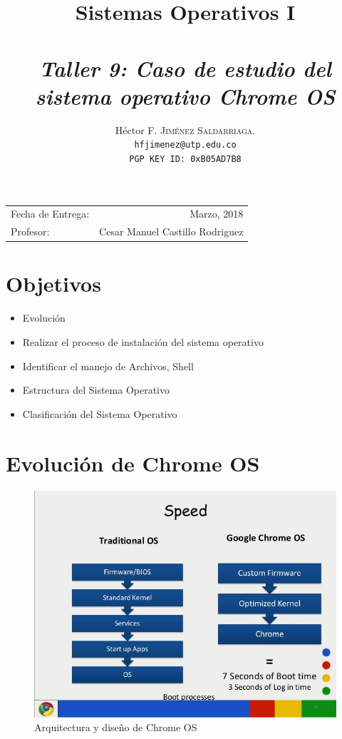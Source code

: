 \documentclass[paper=a4, fontsize=12pt]{article} 		%
\title{Sistemas Operativos I\\ 
\horrule{0.5pt} \\[0.4cm] 								%
\textit{Taller 9: Caso de estudio del sistema operativo Chrome OS}
\horrule{1pt} \\[0.5cm] 			
}
\author{												
Héctor F. \textsc{Jiménez Saldarriaga.}\\				%
\texttt{hfjimenez@utp.edu.co} \\						
\texttt{PGP KEY ID: 0xB05AD7B8}
}
\date{}    						                       %
\numberwithin{equation}{section}						%
\numberwithin{table}{section} 							%
\begin{document}
\maketitle                      			           %
\begin{center}
\begin{tabular}{l r}								   %
Fecha de Entrega: & Marzo, 2018 \\				   %
Profesor: & Cesar Manuel Castillo Rodriguez
\end{tabular}
\end{center}
\section{Objetivos}
\begin{itemize}
	\item Evolución
	\item Realizar el proceso de instalación del sistema operativo	
    \item Identificar el manejo de Archivos, Shell
    \item Estructura del Sistema Operativo
    \item Clasificación del Sistema Operativo
\end{itemize}
\section{Evolución de Chrome OS} 
\begin{center}
\begin{figure}[H]
\includegraphics[scale=0.6]{imgs/design.jpg}
\caption{Arquitectura y diseño de Chrome OS}
\label{fig:dis2}
\end{figure}
\end{center}
\end{document}
